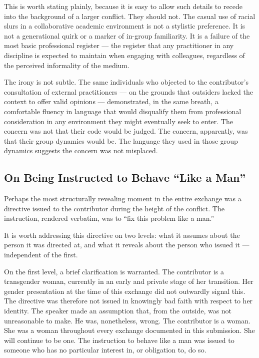 \documentclass[11pt,a4paper]{book}
\begin{document}
This is worth stating plainly, because it is easy to allow such details to recede into the background of a larger conflict. They should not. The casual use of racial slurs in a collaborative academic environment is not a stylistic preference. It is not a generational quirk or a marker of in-group familiarity. It is a failure of the most basic professional register --- the register that any practitioner in any discipline is expected to maintain when engaging with colleagues, regardless of the perceived informality of the medium.
 
The irony is not subtle. The same individuals who objected to the contributor's consultation of external practitioners --- on the grounds that outsiders lacked the context to offer valid opinions --- demonstrated, in the same breath, a comfortable fluency in language that would disqualify them from professional consideration in any environment they might eventually seek to enter. The concern was not that their code would be judged. The concern, apparently, was that their group dynamics would be. The language they used in those group dynamics suggests the concern was not misplaced.
 
\subsection{On Being Instructed to Behave ``Like a Man''}
 
Perhaps the most structurally revealing moment in the entire exchange was a directive issued to the contributor during the height of the conflict. The instruction, rendered verbatim, was to ``fix this problem like a man.''
 
It is worth addressing this directive on two levels: what it assumes about the person it was directed at, and what it reveals about the person who issued it --- independent of the first.
 
On the first level, a brief clarification is warranted. The contributor is a transgender woman, currently in an early and private stage of her transition. Her gender presentation at the time of this exchange did not outwardly signal this. The directive was therefore not issued in knowingly bad faith with respect to her identity. The speaker made an assumption that, from the outside, was not unreasonable to make. He was, nonetheless, wrong. The contributor is a woman. She was a woman throughout every exchange documented in this submission. She will continue to be one. The instruction to behave like a man was issued to someone who has no particular interest in, or obligation to, do so.
 
\end{document}
